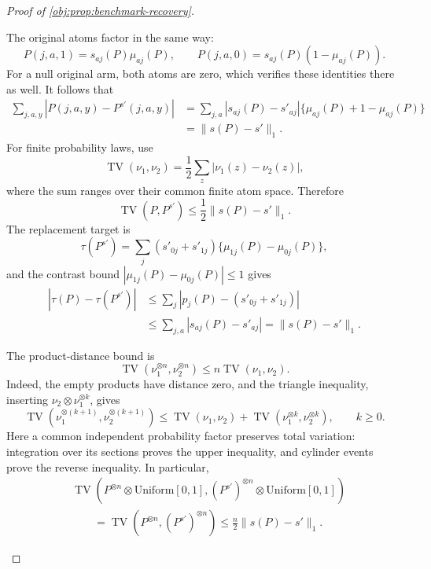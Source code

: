 \documentclass[11pt]{article}
\begin{document}
\begin{proof}[Proof of \cref{obj:prop:benchmark-recovery}]
\begin{enumerate}
The original atoms factor in the same way:
\[
P(j,a,1)=s_{aj}(P)\mu_{aj}(P),
\qquad
P(j,a,0)=s_{aj}(P)(1-\mu_{aj}(P)).
\]
For a null original arm, both atoms are zero, which verifies these identities there as well. It follows that
\[
\begin{aligned}
\sum_{j,a,y}|P(j,a,y)-P^{s'}(j,a,y)|
&=\sum_{j,a}|s_{aj}(P)-s'_{aj}|
   \{\mu_{aj}(P)+1-\mu_{aj}(P)\}\\
&=\|s(P)-s'\|_1.
\end{aligned}
\]
For finite probability laws, use
\[
\operatorname{TV}(\nu_1,\nu_2)
=\frac12\sum_z|\nu_1(z)-\nu_2(z)|,
\]
where the sum ranges over their common finite atom space. Therefore
\[
\operatorname{TV}(P,P^{s'})
\le\frac12\|s(P)-s'\|_1.
\]
The replacement target is
\[
\tau(P^{s'})
=\sum_j(s'_{0j}+s'_{1j})
       \{\mu_{1j}(P)-\mu_{0j}(P)\},
\]
and the contrast bound \(|\mu_{1j}(P)-\mu_{0j}(P)|\le1\) gives
\[
\begin{aligned}
|\tau(P)-\tau(P^{s'})|
&\le
\sum_j|p_j(P)-(s'_{0j}+s'_{1j})|\\
&\le\sum_{j,a}|s_{aj}(P)-s'_{aj}|
=\|s(P)-s'\|_1.
\end{aligned}
\]

The product-distance bound is
\[
\operatorname{TV}(\nu_1^{\otimes n},\nu_2^{\otimes n})
\le n\operatorname{TV}(\nu_1,\nu_2).
\]
Indeed, the empty products have distance zero, and the triangle inequality, inserting
\(\nu_2\otimes\nu_1^{\otimes k}\), gives
\[
\operatorname{TV}(\nu_1^{\otimes(k+1)},\nu_2^{\otimes(k+1)})
\le
\operatorname{TV}(\nu_1,\nu_2)
+\operatorname{TV}(\nu_1^{\otimes k},\nu_2^{\otimes k}),
\qquad k\ge0.
\]
Here a common independent probability factor preserves total variation: integration over its sections proves the upper inequality, and cylinder events prove the reverse inequality. In particular,
\[
\begin{aligned}
&\operatorname{TV}\!\left(
P^{\otimes n}\otimes\mathrm{Uniform}[0,1],
(P^{s'})^{\otimes n}\otimes\mathrm{Uniform}[0,1]\right)\\
&\qquad=
\operatorname{TV}(P^{\otimes n},(P^{s'})^{\otimes n})
\le \frac n2\|s(P)-s'\|_1.
\end{aligned}
\]


\end{enumerate}
\end{proof}
\end{document}
